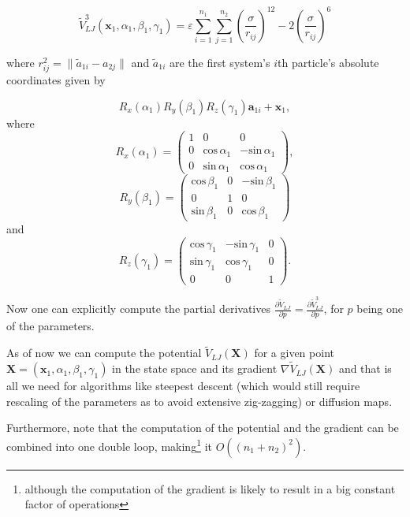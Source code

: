 \begin{equation}
	\tilde V_{LJ}^3(\mathbf x_1,\alpha_1,\beta_1,\gamma_1) = \varepsilon 
	\sum_{i=1}^{n_1}\sum_{j=1}^{n_2}\left(\frac{\sigma}{r_{ij}}\right)^{12} 
	- 2 \left(\frac{\sigma}{r_{ij}}\right)^6
\end{equation}

where $r_{ij}^2 = \|\tilde a_{1i}-a_{2j}\|$ and $\tilde a_{1i}$ are the first system's $i$th particle's absolute coordinates given by

$$R_x(\alpha_1)R_y(\beta_1)R_z(\gamma_1)\mathbf a_{1i} + \mathbf x_1,$$ where $$R_x(\alpha_1) = \left(\begin{array}{ccc}
1 & 0 & 0 \\
0 & \text{cos}\,\alpha_1 & -\text{sin}\,\alpha_1 \\
0 & \text{sin}\,\alpha_1 &  \text{cos}\,\alpha_1 \end{array}\right),$$ $$R_y(\beta_1)=\left(\begin{array}{ccc}
\text{cos}\,\beta_1 & 0 & -\text{sin}\,\beta_1 \\
0 & 1 & 0\\
\text{sin}\,\beta_1 & 0 &  \text{cos}\,\beta_1\end{array}\right)$$ and $$R_z(\gamma_1) = \left(\begin{array}{ccc}
\text{cos}\,\gamma_1 & -\text{sin}\,\gamma_1 & 0 \\
\text{sin}\,\gamma_1 &  \text{cos}\,\gamma_1 & 0 \\
0 & 0 & 1 \end{array}\right).$$

Now one can explicitly compute the partial derivatives $\frac{\partial \tilde V_{LJ}}{\partial p} = \frac{\partial \tilde V_{LJ}^3}{\partial p}$, for $p$ being one of the parameters.

As of now we can compute the potential $\tilde V_{LJ}(\mathbf X)$ for a given point $\mathbf X = (\mathbf x_1,\alpha_1,\beta_1,\gamma_1)$ in the state space and its gradient $\nabla \tilde V_{LJ}(\mathbf X)$ and that is all we need for algorithms like steepest descent (which would still require rescaling of the parameters as to avoid extensive zig-zagging) or diffusion maps.

Furthermore, note that the computation of the potential and the gradient can be combined into one double loop, making\footnote{although the computation of the gradient is likely to result in a big constant factor of operations} it $O\left((n_1+n_2)^2\right)$.



